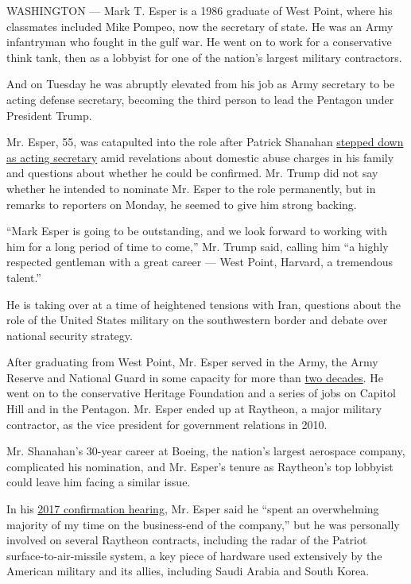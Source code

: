WASHINGTON --- Mark T. Esper is a 1986 graduate of West Point, where his
classmates included Mike Pompeo, now the secretary of state. He was an
Army infantryman who fought in the gulf war. He went on to work for a
conservative think tank, then as a lobbyist for one of the nation's
largest military contractors.

And on Tuesday he was abruptly elevated from his job as Army secretary
to be acting defense secretary, becoming the third person to lead the
Pentagon under President Trump.

Mr. Esper, 55, was catapulted into the role after Patrick Shanahan
\href{https://www.nytimes.com/2019/06/18/us/politics/patrick-shanahan-defense-secretary.html}{stepped
down as acting secretary} amid revelations about domestic abuse charges
in his family and questions about whether he could be confirmed. Mr.
Trump did not say whether he intended to nominate Mr. Esper to the role
permanently, but in remarks to reporters on Monday, he seemed to give
him strong backing.

``Mark Esper is going to be outstanding, and we look forward to working
with him for a long period of time to come,'' Mr. Trump said, calling
him ``a highly respected gentleman with a great career --- West Point,
Harvard, a tremendous talent.''

He is taking over at a time of heightened tensions with Iran, questions
about the role of the United States military on the southwestern border
and debate over national security strategy.

After graduating from West Point, Mr. Esper served in the Army, the Army
Reserve and National Guard in some capacity for more than
\href{https://www.army.mil/leaders/sa/bio/?from=wiki}{two decades}. He
went on to the conservative Heritage Foundation and a series of jobs on
Capitol Hill and in the Pentagon. Mr. Esper ended up at Raytheon, a
major military contractor, as the vice president for government
relations in 2010.

Mr. Shanahan's 30-year career at Boeing, the nation's largest aerospace
company, complicated his nomination, and Mr. Esper's tenure as
Raytheon's top lobbyist could leave him facing a similar issue.

In his
\href{https://www.armed-services.senate.gov/imo/media/doc/17-86_11-02-17.pdf}{2017
confirmation hearing}, Mr. Esper said he ``spent an overwhelming
majority of my time on the business-end of the company,'' but he was
personally involved on several Raytheon contracts, including the radar
of the Patriot surface-to-air-missile system, a key piece of hardware
used extensively by the American military and its allies, including
Saudi Arabia and South Korea.

